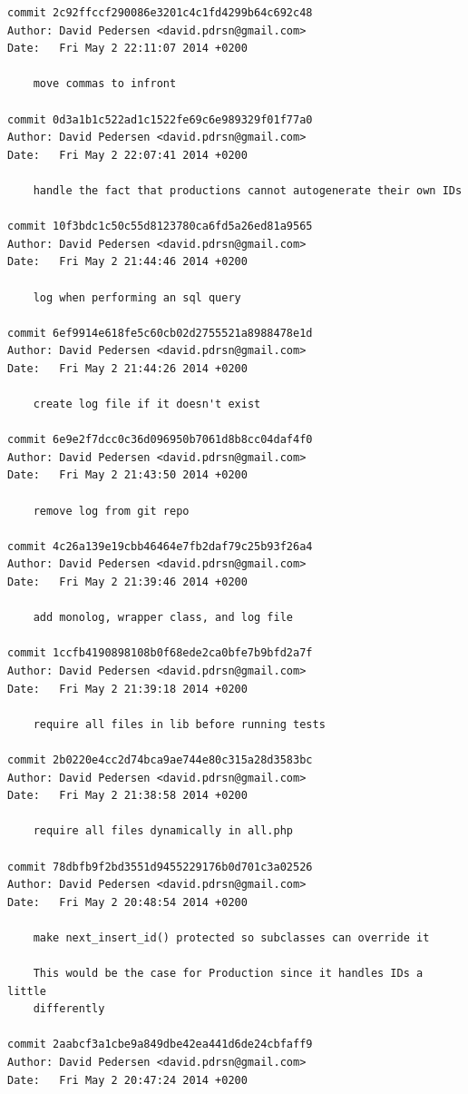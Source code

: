 \documentclass[12pt]{article}
\begin{document}
\begin{verbatim}
commit 2c92ffccf290086e3201c4c1fd4299b64c692c48
Author: David Pedersen <david.pdrsn@gmail.com>
Date:   Fri May 2 22:11:07 2014 +0200

    move commas to infront

commit 0d3a1b1c522ad1c1522fe69c6e989329f01f77a0
Author: David Pedersen <david.pdrsn@gmail.com>
Date:   Fri May 2 22:07:41 2014 +0200

    handle the fact that productions cannot autogenerate their own IDs

commit 10f3bdc1c50c55d8123780ca6fd5a26ed81a9565
Author: David Pedersen <david.pdrsn@gmail.com>
Date:   Fri May 2 21:44:46 2014 +0200

    log when performing an sql query

commit 6ef9914e618fe5c60cb02d2755521a8988478e1d
Author: David Pedersen <david.pdrsn@gmail.com>
Date:   Fri May 2 21:44:26 2014 +0200

    create log file if it doesn't exist

commit 6e9e2f7dcc0c36d096950b7061d8b8cc04daf4f0
Author: David Pedersen <david.pdrsn@gmail.com>
Date:   Fri May 2 21:43:50 2014 +0200

    remove log from git repo

commit 4c26a139e19cbb46464e7fb2daf79c25b93f26a4
Author: David Pedersen <david.pdrsn@gmail.com>
Date:   Fri May 2 21:39:46 2014 +0200

    add monolog, wrapper class, and log file

commit 1ccfb4190898108b0f68ede2ca0bfe7b9bfd2a7f
Author: David Pedersen <david.pdrsn@gmail.com>
Date:   Fri May 2 21:39:18 2014 +0200

    require all files in lib before running tests

commit 2b0220e4cc2d74bca9ae744e80c315a28d3583bc
Author: David Pedersen <david.pdrsn@gmail.com>
Date:   Fri May 2 21:38:58 2014 +0200

    require all files dynamically in all.php

commit 78dbfb9f2bd3551d9455229176b0d701c3a02526
Author: David Pedersen <david.pdrsn@gmail.com>
Date:   Fri May 2 20:48:54 2014 +0200

    make next_insert_id() protected so subclasses can override it
    
    This would be the case for Production since it handles IDs a little
    differently

commit 2aabcf3a1cbe9a849dbe42ea441d6de24cbfaff9
Author: David Pedersen <david.pdrsn@gmail.com>
Date:   Fri May 2 20:47:24 2014 +0200


\end{verbatim}
\end{document}
